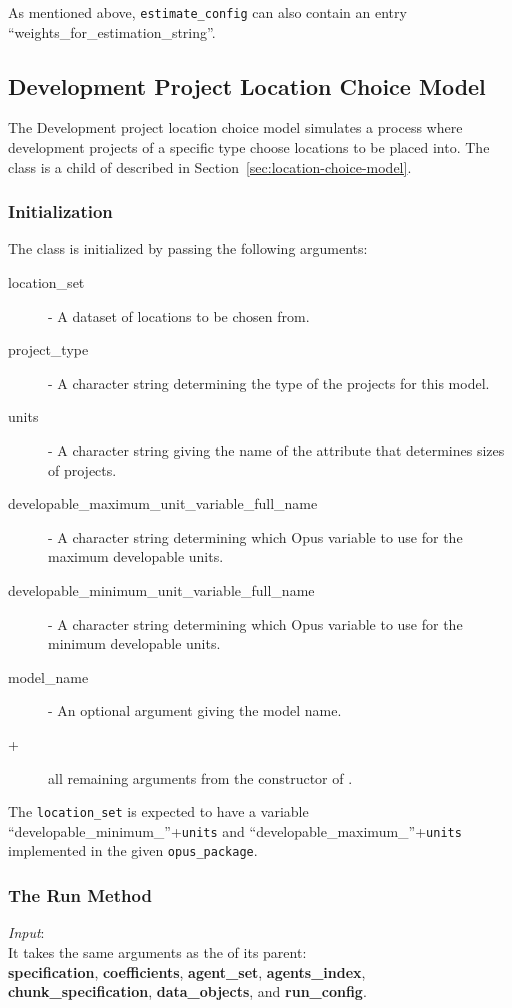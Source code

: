 As mentioned above, \verb|estimate_config| can also contain an entry ``weights_for_estimation_string''.


\subsection{Development Project Location Choice Model}
\label{sec:development-project-lcm}
%
The Development project location choice model simulates a process where
development projects of a specific type choose locations to be placed into.
The class  is a child of
 described in
Section~\ref{sec:location-choice-model}.

\subsubsection{Initialization}
%
The class is initialized by passing the following arguments:
\begin{description}
\item[location_set] - A dataset of locations to be chosen from.
\item[project_type] - A character string determining the type of the projects
  for this model. 
\item[units] - A character string giving the name of the attribute that
  determines sizes of projects.
\item[developable_maximum_unit_variable_full_name] -  A character string determining
  which Opus variable to use for the maximum developable units.
\item[developable_minimum_unit_variable_full_name] -  A character string determining
  which Opus variable to use for the minimum developable units.
\item[model_name] - An optional argument giving the model name.
\item[+] all remaining arguments from the constructor of
  . 
\end{description}
The \verb|location_set| is expected to have a variable
``developable_minimum_''+\verb|units| and ``developable_maximum_''+\verb|units|
implemented in the given \verb|opus_package|.


\subsubsection{The Run Method}
%
{\it Input}:\\[1mm]
It takes the same arguments as the  of its parent: \\
{\bf specification}, {\bf coefficients}, {\bf agent_set}, {\bf agents_index},
{\bf chunk_specification}, {\bf data_objects}, and {\bf run_config}.

